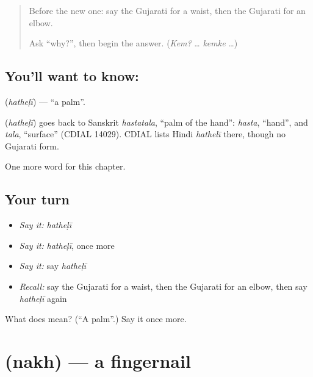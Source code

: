 \label{lesson:GU-C126-hatheli}



\begin{quote}
Before the new one: say the Gujarati for a waist, then the Gujarati for an elbow.

Ask \textquotedblleft{}why?\textquotedblright{}, then begin the answer. (\emph{Kem?} … \emph{kemke} …)
\end{quote}

\subsection*{You'll want to know: }
\textbf{} (\emph{hatheḷī}) — \textquotedblleft{}a palm\textquotedblright{}.

\begin{cousinweb}
\textbf{} (\emph{hatheḷī}) goes back to Sanskrit \emph{hastatala}, \textquotedblleft{}palm of the hand\textquotedblright{}: \emph{hasta}, \textquotedblleft{}hand\textquotedblright{}, and \emph{tala}, \textquotedblleft{}surface\textquotedblright{} (CDIAL 14029). CDIAL lists Hindi \emph{hathelī} there, though no Gujarati form.
\end{cousinweb}

\begin{grammarlens}[title={What you've built}]
One more word for this chapter.
\end{grammarlens}

\subsection*{Your turn}
\begin{itemize}
\raggedright
  \item \emph{Say it:} \emph{hatheḷī}
  \item \emph{Say it:} \emph{hatheḷī}, once more
  \item \emph{Say it:} say \emph{hatheḷī}
  \item \emph{Recall:} say the Gujarati for a waist, then the Gujarati for an elbow, then say \emph{hatheḷī} again
\end{itemize}

\begin{tcolorbox}[breakable,colback=teal!4,colframe=teal!35!black,title={Before you move on}]
What does  mean? (\textquotedblleft{}A palm\textquotedblright{}.) Say it once more.
\end{tcolorbox}
\section[\texorpdfstring{\gu{નખ} (nakh)}{નખ (nakh)}]{ (nakh) — a fingernail}

